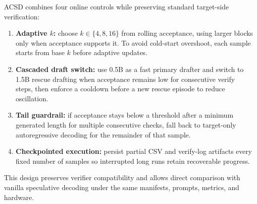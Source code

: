ACSD combines four online controls while preserving standard target-side
verification:
\begin{enumerate}
  \item \textbf{Adaptive $k$:} choose $k\in\{4,8,16\}$ from rolling acceptance,
        using larger blocks only when acceptance supports it. To avoid cold-start
        overshoot, each sample starts from base $k$ before adaptive updates.
  \item \textbf{Cascaded draft switch:} use 0.5B as a fast primary drafter and
        switch to 1.5B rescue drafting when acceptance remains low for
        consecutive verify steps, then enforce a cooldown before a new rescue
        episode to reduce oscillation.
  \item \textbf{Tail guardrail:} if acceptance stays below a threshold after a
        minimum generated length for multiple consecutive checks, fall back to
        target-only autoregressive decoding for the remainder of that sample.
  \item \textbf{Checkpointed execution:} persist partial CSV and verify-log
        artifacts every fixed number of samples so interrupted long runs retain
        recoverable progress.
\end{enumerate}

This design preserves verifier compatibility and allows direct comparison with
vanilla speculative decoding under the same manifests, prompts, metrics, and
hardware.

